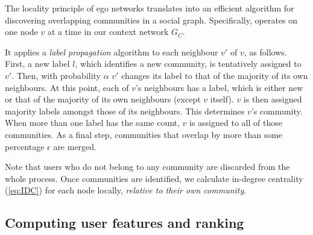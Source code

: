The locality principle of ego networks translates into an efficient algorithm for discovering overlapping communities in a social graph. 
Specifically, \demon operates on one node $v$ at a time in our context network $G_C$.

It applies a \textit{label propagation} algorithm to each neighbour $v'$ of $v$, as follows. First, a new label $l$, which identifies a new community, is tentatively assigned to $v'$. 
	Then, with probability $\alpha$ $v'$ changes its label to that of the majority of its own neighbours. 
	At this point, each of $v$'s neighbours has a label, which is either new or that of the majority of its own neighbours (except $v$ itself).
	$v$ is then assigned majority labels amongst those of its neighbours. 
	This determines $v$'s community. 
	When more than one label has the same count, $v$ is assigned to all of those communities.
%
As a final step, communities that overlap by more than some percentage $\epsilon $ are merged.

Note that users who do not belong to any community are discarded from the whole process.
Once communities are identified, we calculate  in-degree centrality (\ref{eq:IDC}) for each node locally, \textit{relative to their own community}.



\subsection{Computing user features and ranking  }  \label{sec:features}

